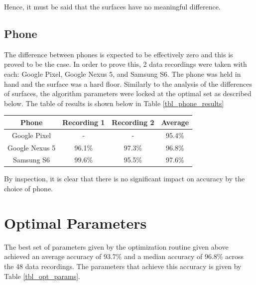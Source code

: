                 Hence, it must be said that the surfaces have no meaningful difference.

            \subsection{Phone}

                The difference between phones is expected to be effectively zero and this is proved to be the case. In order to prove this, 2 data recordings were taken with each: Google Pixel, Google Nexus 5, and Samsung S6. The phone was held in hand and the surface was a hard floor. Similarly to the analysis of the differences of surfaces, the algorithm parameters were locked at the optimal set as described below. The table of results is shown below in Table \ref{tbl_phone_results}

                \begin{center}
                    \label{tbl_phone_results}
                    \begin{tabular}{|c|c|c||c|}
                        \hline
                        Phone & Recording 1 & Recording 2 & Average\\
                        \hline
                        Google Pixel & - & - & 95.4\% \\
                        Google Nexus 5 & 96.1\% & 97.3\% & 96.8\% \\
                        Samsung S6 & 99.6\% & 95.5\% & 97.6\% \\
                        \hline
                    \end{tabular}
                \end{center}

                By inspection, it is clear that there is no significant impact on accuracy by the choice of phone.                

        \section{Optimal Parameters}

            The best set of parameters given by the optimization routine given above achieved an average accuracy of 93.7\% and a median accuracy of 96.8\% across the 48 data recordings. The parameters that achieve this accuracy is given by Table \ref{tbl_opt_params}.

